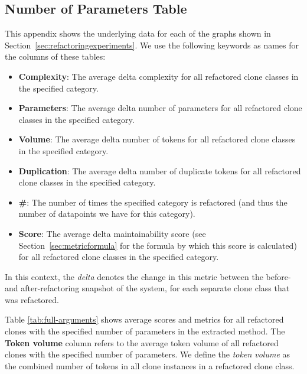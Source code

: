 \begin{appendices}

	\chapter{Number of Parameters Table}\label{sec:parameterstable}
	This appendix shows the underlying data for each of the graphs shown in Section~\ref{sec:refactoringexperiments}. We use the following keywords as names for the columns of these tables:
	\begin{itemize}
		\item \textbf{Complexity}: The average delta complexity for all refactored clone classes in the specified category.
		\item \textbf{Parameters}: The average delta number of parameters for all refactored clone classes in the specified category.
		\item \textbf{Volume}: The average delta number of tokens for all refactored clone classes in the specified category.
		\item \textbf{Duplication}: The average delta number of duplicate tokens for all refactored clone classes in the specified category.
		\item \textbf{\#}: The number of times the specified category is refactored (and thus the number of datapoints we have for this category).
		\item \textbf{Score}: The average delta maintainability score (see Section~\ref{sec:metricformula} for the formula by which this score is calculated) for all refactored clone classes in the specified category.
	\end{itemize}
	In this context, the \textit{delta} denotes the change in this metric between the before- and after-refactoring snapshot of the system, for each separate clone class that was refactored.

Table \ref{tab:full-arguments} shows average scores and metrics for all refactored clones with the specified number of parameters in the extracted method. The \textbf{Token volume} column refers to the average token volume of all refactored clones with the specified number of parameters. We define the \textit{token volume} as the combined number of tokens in all clone instances in a refactored clone class.


\end{appendices}
